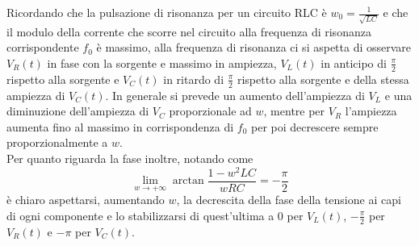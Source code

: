 \documentclass{article}
\begin{document}
Ricordando che la pulsazione di risonanza per un circuito RLC è $w_0=\frac{1}{\sqrt{LC}}$ e che il modulo della corrente che scorre nel circuito alla frequenza di risonanza corrispondente $f_0$ è massimo, alla frequenza di risonanza ci si aspetta di 
osservare $V_R(t)$ in fase con la sorgente e massimo in ampiezza, $V_L(t)$ in anticipo di $\frac{\pi}{2}$ rispetto alla sorgente e $V_C(t)$ in ritardo di $\frac{\pi}{2}$ rispetto alla sorgente e della stessa ampiezza di  $V_C(t)$. In generale si prevede
un aumento dell'ampiezza di $V_L$ e una diminuzione dell'ampiezza di $V_C$ proporzionale ad $w$, mentre per $V_R$ l'ampiezza aumenta fino al massimo in corrispondenza di $f_0$ per poi decrescere sempre proporzionalmente a $w$. \\Per quanto riguarda la fase inoltre, notando come 
\begin{equation}
  \lim_{w \to + \infty}\arctan{\frac{1-w^2LC}{wRC}} = -\frac{\pi}{2}
\end{equation}
è chiaro aspettarsi, aumentando $w$, la decrescita della fase della tensione ai capi di ogni componente e lo stabilizzarsi di quest'ultima a 0 per $V_L(t)$, $-\frac{\pi}{2}$ per $V_R(t)$ e $-\pi$ per $V_C(t)$.
\end{document}
